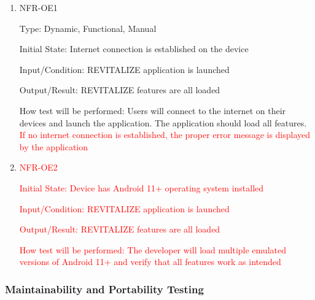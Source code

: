 \documentclass[12pt, titlepage]{article}
\begin{document}
\begin{enumerate}
	
	\item{NFR-OE1\\}
	
	Type: Dynamic, Functional, Manual
	
	Initial State: Internet connection is established on the device
	
	Input/Condition: REVITALIZE application is launched
	
	Output/Result: REVITALIZE features are all loaded 
	
	How test will be performed: Users will connect to the internet on their devices and launch the application. The application should load all features. \textcolor{red}{If no internet connection is established, the proper error message is displayed by the application}
	

	\item{\textcolor{red}{NFR-OE2\\}}

	\textcolor{red}{Initial State: Device has Android 11+ operating system installed}

	\textcolor{red}{Input/Condition: REVITALIZE application is launched}

	\textcolor{red}{Output/Result: REVITALIZE features are all loaded}

	\textcolor{red}{How test will be performed: The developer will load multiple emulated versions of Android 11+ and verify that all features work as intended}
	
\end{enumerate}

\subsubsection{Maintainability and Portability Testing}
\end{document}
